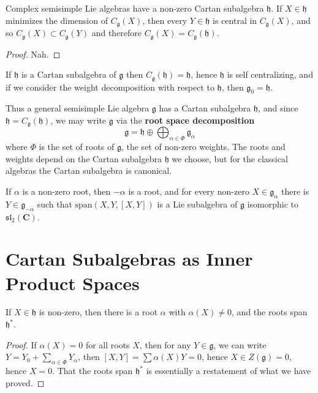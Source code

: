 \begin{theorem}
    Complex semisimple Lie algebras have a non-zero Cartan subalgebra $\mathfrak{h}$. If $X \in \mathfrak{h}$ minimizes the dimension of $C_\mathfrak{g}(X)$, then every $Y \in \mathfrak{h}$ is central in $C_\mathfrak{g}(X)$, and so $C_\mathfrak{g}(X) \subset C_\mathfrak{g}(Y)$ and therefore $C_\mathfrak{g}(X) = C_\mathfrak{g}(\mathfrak{h})$.
\end{theorem}
\begin{proof}
    Nah.
\end{proof}

\begin{theorem}
    If $\mathfrak{h}$ is a Cartan subalgebra of $\mathfrak{g}$ then $C_\mathfrak{g}(\mathfrak{h}) = \mathfrak{h}$, hence $\mathfrak{h}$ is self centralizing, and if we consider the weight decomposition with respect to $\mathfrak{h}$, then $\mathfrak{g}_0 = \mathfrak{h}$.
\end{theorem}

Thus a general semisimple Lie algebra $\mathfrak{g}$ has a Cartan subalgebra $\mathfrak{h}$, and since $\mathfrak{h} = C_\mathfrak{g}(\mathfrak{h})$, we may write $\mathfrak{g}$ via the {\bf root space decomposition}
%
\[ \mathfrak{g} = \mathfrak{h} \oplus \bigoplus_{\alpha \in \Phi} \mathfrak{g}_\alpha \]
%
where $\Phi$ is the set of roots of $\mathfrak{g}$, the set of non-zero weights. The roots and weights depend on the Cartan subalgebra $\mathfrak{h}$ we choose, but for the classical algebras the Cartan subalgebra is canonical.

\begin{lemma}
    If $\alpha$ is a non-zero root, then $-\alpha$ is a root, and for every non-zero $X \in \mathfrak{g}_\alpha$ there is $Y \in \mathfrak{g}_{-\alpha}$ such that $\text{span}(X,Y,[X,Y])$ is a Lie subalgebra of $\mathfrak{g}$ isomorphic to $\mathfrak{sl}_2(\mathbf{C})$.
\end{lemma}





\section{Cartan Subalgebras as Inner Product Spaces}

\begin{lemma}
    If $X \in \mathfrak{h}$ is non-zero, then there is a root $\alpha$ with $\alpha(X) \neq 0$, and the roots span $\mathfrak{h}^*$.
\end{lemma}
\begin{proof}
    If $\alpha(X) = 0$ for all roots $X$, then for any $Y \in \mathfrak{g}$, we can write $Y = Y_0 + \sum_{\alpha \in \Phi} Y_\alpha$, then $[X,Y] = \sum \alpha(X) Y = 0$, hence $X \in Z(\mathfrak{g}) = 0$, hence $X = 0$. That the roots span $\mathfrak{h}^*$ is essentially a restatement of what we have proved.
\end{proof}

